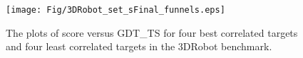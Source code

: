 \begin{figure}[H]
    \centering
    \texttt{[image: Fig/3DRobot\_set\_sFinal\_funnels.eps]}
%
    \caption{The plots of score versus GDT\_TS for four best correlated targets and four
    least correlated targets in the 3DRobot benchmark.}
    \label{Fig:3DRobotBenchmark}
\end{figure}
